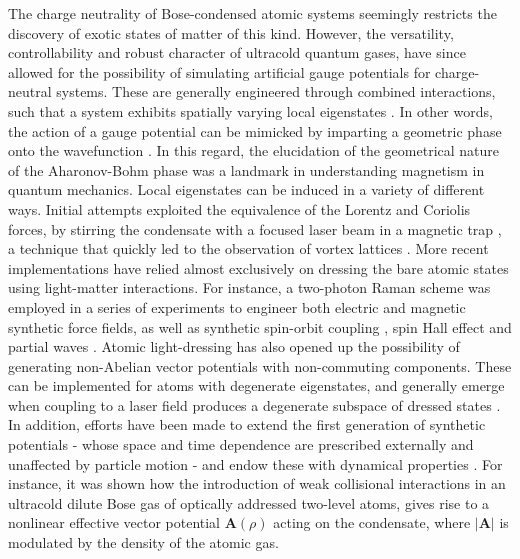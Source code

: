 \documentclass[twocolumn, nofootinbib, nobibnotes, amsmath,amssymb,aps, pra, floatfix]{revtex4-1}
\renewcommand{\v}[1]{\ensuremath{\mathbf{#1}}} %
\newcommand{\abs}[1]{\left| #1 \right|} %
\begin{document}
The charge neutrality of Bose-condensed atomic systems seemingly restricts the discovery of exotic states of matter of this kind.
However, the versatility, controllability and robust character of ultracold quantum gases, have since allowed for the possibility of simulating artificial gauge potentials for charge-neutral systems.
These are generally engineered through combined interactions, such that a system exhibits spatially varying local eigenstates \cite{dalibard2011colloquium,goldman2014light}.
In other words, the action of a gauge potential can be mimicked by imparting a geometric phase onto the wavefunction \cite{berry1984quantal,peskin1989aharonov,dalibard2011colloquium,goldman2014light}.
In this regard, the elucidation of the geometrical nature of the Aharonov-Bohm phase \cite{berry1984quantal} was a landmark in understanding magnetism in quantum mechanics.
Local eigenstates can be induced in a variety of different ways.
Initial attempts exploited the equivalence of the Lorentz and Coriolis forces, by stirring the condensate with a focused laser beam in a magnetic trap \cite{madison2000vortex}, a technique that quickly led to the observation of vortex lattices \cite{abo2001observation}.
More recent implementations have relied almost exclusively on dressing the bare atomic states using light-matter interactions.
For instance, a two-photon Raman scheme \cite{lin2016synthetic} was employed in a series of experiments to engineer both electric \cite{lin2011synthetic} and magnetic \cite{lin2009synthetic} synthetic force fields, as well as synthetic spin-orbit coupling \cite{lin2011spin}, spin Hall effect \cite{beeler2013spin} and partial waves \cite{williams2012synthetic}.
Atomic light-dressing has also opened up the possibility of generating non-Abelian vector potentials with non-commuting components.
These can be implemented for atoms with degenerate eigenstates, and generally emerge when coupling to a laser field produces a degenerate subspace of dressed states \cite{dalibard2011colloquium}.
In addition, efforts have been made to extend the first generation of synthetic potentials - whose space and time dependence are prescribed externally and unaffected by particle motion - and endow these with dynamical properties \cite{lin2016synthetic}. 
For instance, it was shown \cite{edmonds2013} how the introduction of weak collisional interactions in an ultracold dilute Bose gas of optically addressed two-level atoms, gives rise to a nonlinear effective vector potential $\v{A}(\rho)$ acting on the condensate, where $\abs{\v{A}}$ is modulated by the density of the atomic gas. 
\end{document}
